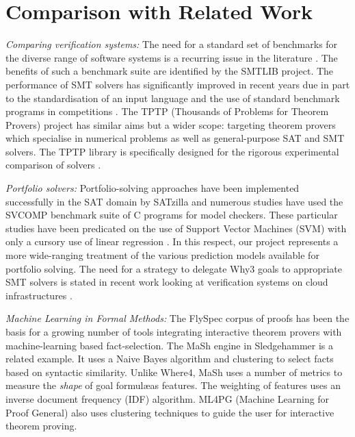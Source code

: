 \documentclass[runningheads,a4paper]{llncs}
\begin{document}
\section{Comparison with Related Work}
\label{sec:related}
\textit{Comparing verification systems:} The need for a standard set of benchmarks for the diverse range of software systems is a recurring issue in the literature \cite{Dagstuhl}. The benefits of such a benchmark suite are identified by the SMTLIB \cite{SMTLIB} project. The performance of SMT solvers has significantly improved in recent years due in part to the standardisation of an input language and the use of standard benchmark programs in  competitions \cite{SMTEVAL2013}\cite{SVCOMP}. The TPTP (Thousands of Problems for Theorem Provers) project \cite{TPTP} has similar aims but a wider scope: targeting theorem provers which specialise in numerical problems as well as general-purpose SAT and SMT solvers. The TPTP library is specifically designed for the rigorous experimental comparison of solvers \cite{Sutcliffe200139}.           

\textit{Portfolio solvers:} Portfolio-solving approaches have been implemented successfully in the SAT domain by SATzilla \cite{Satzilla} and numerous studies \cite{MUX}\cite{DPVZ15:CAV} have used the SVCOMP \cite{SVCOMP} benchmark suite of C programs for model checkers. These particular studies have been predicated on the use of Support Vector Machines (SVM) with only a cursory use of linear regression \cite{MUX}. In this respect, our project represents a more wide-ranging treatment of the various prediction models available for portfolio solving. The need for a strategy to delegate \textsf{Why3} goals to appropriate SMT solvers is stated in recent work looking at verification systems on cloud infrastructures \cite{rodinplugin}.

\textit{Machine Learning in Formal Methods:} 
The FlySpec \cite{Flyspec} corpus of proofs has been the basis for a growing number of tools integrating interactive theorem provers with machine-learning based fact-selection. The MaSh engine in Sledgehammer \cite{Sledgehammer} is a related example. It uses a Naive Bayes algorithm and clustering to select facts based on syntactic similarity. 
Unlike \textsf{Where4}, MaSh uses a number of metrics to measure the \textit{shape} of goal formul\ae as features. 
The weighting of features uses an inverse document frequency (IDF) algorithm.
ML4PG (Machine Learning for Proof General) \cite{ML4PG} also uses clustering techniques to guide the user for interactive theorem proving.
\end{document}
